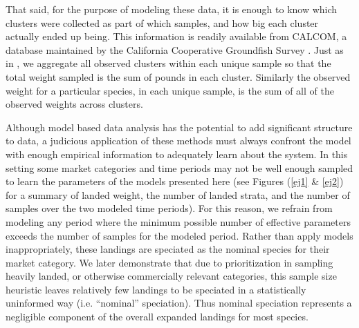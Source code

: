 \documentclass[12pt]{article}
\begin{document}
%
That said, for the purpose of modeling these data, it is enough to know
which clusters were collected as part of which samples, and how big each
cluster actually ended up being. This information is readily available
from CALCOM, a database maintained by the California Cooperative
Groundfish Survey . Just as in 
, we aggregate all observed clusters within 
each unique sample so that the total weight sampled is the sum of pounds in 
each cluster. Similarly the observed weight for a particular species, in each 
unique sample, is the sum of all of the observed weights across clusters.  

%
Although model based data analysis has the potential to add significant
structure to data, a judicious application of these methods must always
confront the model with enough empirical information to adequately learn
about the system. In this setting some market categories and time
periods may not be well enough sampled to learn the parameters of the
models presented here (see Figures (\ref{ej1} \& \ref{ej2}) for a summary of 
landed weight, the number of landed strata, and the number of samples over the 
two modeled time periods). For this reason, we refrain from modeling any 
period where the minimum possible number of effective parameters exceeds the 
number of samples for the modeled period. Rather than apply models 
inappropriately, these landings are speciated as the nominal species for their 
market category. We later demonstrate that due to prioritization in sampling 
heavily landed, or otherwise commercially relevant categories, this sample 
size heuristic leaves relatively few landings to be speciated in a 
statistically uninformed way (i.e. ``nominal'' speciation). Thus nominal 
speciation represents a negligible component of the overall expanded landings 
for most species.


\end{document}
